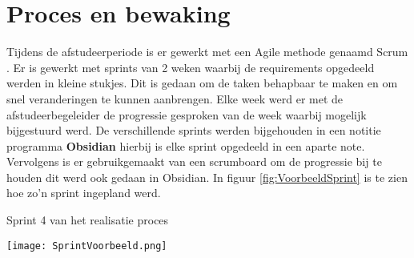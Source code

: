 \section{Proces en bewaking}
Tijdens de afstudeerperiode is er gewerkt met een Agile \parencite{Agile} methode genaamd Scrum \Parencite{Scrum}.
Er is gewerkt met sprints van 2 weken waarbij de requirements opgedeeld werden in kleine stukjes.
Dit is gedaan om de taken behapbaar te maken en om snel veranderingen te kunnen aanbrengen.
Elke week werd er met de afstudeerbegeleider de progressie gesproken van de week waarbij mogelijk bijgestuurd werd.
De verschillende sprints werden bijgehouden in een notitie programma \textbf{Obsidian} hierbij is elke sprint opgedeeld in een aparte note.
Vervolgens is er gebruikgemaakt van een scrumboard om de progressie bij te houden dit werd ook gedaan in Obsidian.
In figuur \ref{fig:VoorbeeldSprint} is te zien hoe zo'n sprint ingepland werd.

\whitespace[2]
\begin{graphic}
	\captionsetup{type=figure}
	\caption{Sprint 4 van het realisatie proces}
	\texttt{[image: SprintVoorbeeld.png]}
	\label{fig:VoorbeeldSprint}
\end{graphic}

